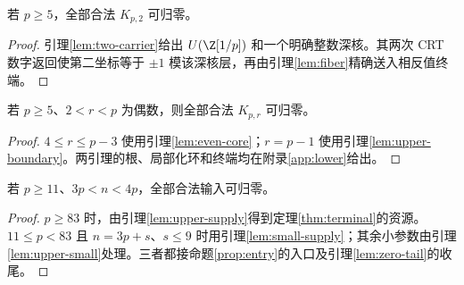 \begin{proposition}\label{prop:r2}
若 $p\ge5$，全部合法 $K_{p,2}$ 可归零。
\end{proposition}
\begin{proof}
引理\ref{lem:two-carrier}给出 $U(\Z[1/p])$ 和一个明确整数深核。其两次 CRT 数字返回使第二坐标等于 $\pm1$ 模该深核层，再由引理\ref{lem:fiber}精确送入相反值终端。
\end{proof}

\begin{proposition}\label{prop:even}
若 $p\ge5$、$2<r<p$ 为偶数，则全部合法 $K_{p,r}$ 可归零。
\end{proposition}
\begin{proof}
$4\le r\le p-3$ 使用引理\ref{lem:even-core}；$r=p-1$ 使用引理\ref{lem:upper-boundary}。两引理的根、局部化环和终端均在附录\ref{app:lower}给出。
\end{proof}

\begin{proposition}\label{prop:upper}
若 $p\ge11$、$3p<n<4p$，全部合法输入可归零。
\end{proposition}
\begin{proof}
$p\ge83$ 时，由引理\ref{lem:upper-supply}得到定理\ref{thm:terminal}的资源。$11\le p<83$ 且 $n=3p+s$、$s\le9$ 时用引理\ref{lem:small-supply}；其余小参数由引理\ref{lem:upper-small}处理。三者都接命题\ref{prop:entry}的入口及引理\ref{lem:zero-tail}的收尾。
\end{proof}
